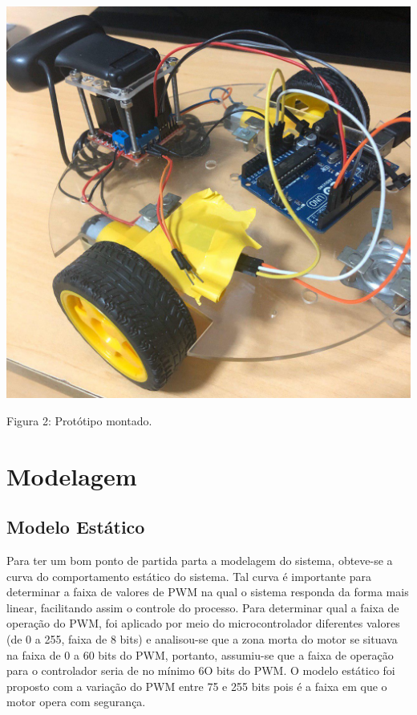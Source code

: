 \documentclass{article}
\begin{document}
\begin{center}
\centering
  \includegraphics[scale=0.15]{imagens/montagemFinal.jpg}
  
  \caption{Figura 2: Protótipo montado.}
\end{center}

\section{Modelagem}


\subsection{Modelo Estático}
Para ter um bom ponto de partida parta a modelagem do sistema, obteve-se a curva do comportamento estático do sistema. Tal curva é importante para determinar a faixa de valores de PWM na qual o sistema responda da forma mais linear, facilitando assim o controle do processo.
Para determinar qual a faixa de operação do PWM, foi aplicado por meio do microcontrolador diferentes valores (de 0 a 255, faixa de 8 bits) e analisou-se que a zona morta do motor se situava na faixa de 0 a 60 bits do PWM, portanto, assumiu-se que a faixa de operação para o controlador seria de no mínimo 6O bits do PWM. O modelo estático foi proposto com a variação do PWM entre 75 e 255 bits pois é a faixa em que o motor opera com segurança.
\end{document}
